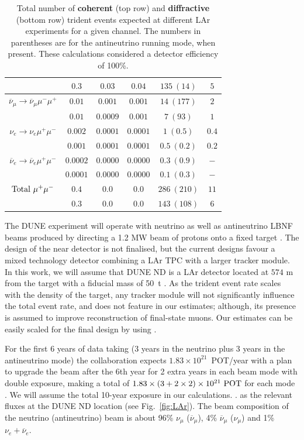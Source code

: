 \begin{table}[t]
\begin{center}
{\begin{tabular}{|cccccc|}
        &$0.3$ &$0.03$ &$0.04$ &$135~(14)$ & $5$\\\hline
        $\overline\nu_\mu\to\overline\nu_\mu \mu^- \mu^+$& $0.01$ &$0.001$ &$0.001$ &$14~(177)$ & $2$\\
        &$0.01$ &$0.0009$ &$0.001$ &$7~(93)$ & $1$\\\hline
 $\nu_e\to\nu_e \mu^+ \mu^-$    &$0.002$ &$0.0001$ &$0.0001$ &$1~(0.5)$ & $0.4$\\  
 &$0.001$ &$0.0001$ &$0.0001$ &$0.5~(0.2)$ & $0.2$\\\hline
        $\overline\nu_e\to\overline\nu_e \mu^+ \mu^-$&$0.0002$ &$0.0000$ &$0.0000$ &$0.3~(0.9)$ & $-$\\
        &$0.0001$ &$0.0000$ &$0.0000$ &$0.1~(0.3)$ & $-$\\\hline
        \hline\hline
    ${\rm{Total}} \ \mu^+ \mu^-$ &$0.4$ &$0.0$ &$0.0$ &$286~(210)$ & $11$ \\
    &$0.3$ &$0.0$ &$0.0$ &$143~(108)$ & $6$\\
    \hline\hline
\end{tabular}}
\end{center}
\caption{\label{tab:LArrates}Total number of \textbf{coherent} (top row) and \textbf{diffractive} (bottom row) trident events expected at different LAr experiments for a given channel.
The numbers in parentheses are for the antineutrino running mode, when present. These calculations  
considered a detector efficiency of 100\%. }
\end{table}

The DUNE experiment will operate with neutrino as well as antineutrino LBNF beams produced by 
directing a 1.2 MW beam of protons onto a fixed target \cite{Acciarri:2016ooe,DUNECDRvolII}. 
The design of the near detector is not finalised, but the current designs favour a mixed technology  detector combining a LAr TPC with a larger tracker module.  In this work, we will assume that DUNE ND is a LAr detector located at $574$ m from the target with a fiducial mass of 50~t \cite{WeberTalk}. As the trident event rate scales with the density of the target, any tracker module will not significantly influence the total event rate, and does not feature in our estimates; although, its presence is assumed to improve reconstruction of final-state muons. Our estimates can be easily scaled for the final design by using .

For the first 6 years of data taking (3 years in the neutrino plus 3 years in the antineutrino 
mode) the collaboration expects $1.83\times 10^{21}$~POT/year with  a plan to upgrade the beam after the 6th year for 2 extra years in each beam mode  with double exposure, making a total of $1.83 \times(3+2\times2)\times 10^{21}~{\rm{POT}}$ for each mode \cite{DUNE:exposure}. We will 
assume the total 10-year exposure in our calculations.
%
. as the relevant fluxes at the DUNE ND location (see Fig.~\ref{fig:LAr}). The beam composition of the neutrino (antineutrino) beam is about 96\% $\nu_\mu$ ($\overline\nu_\mu$), 4\%  $\overline\nu_\mu$ ($\nu_\mu$) and 1\% $\nu_e+\overline\nu_e$.
 
